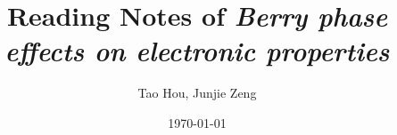 \documentclass[notitlepage]{revtex4-1}%
\begin{document}
	\title{Reading Notes of \textit{Berry phase effects on electronic properties}}
	\author{Tao Hou, Junjie Zeng}
	\date{\today}
	
	\maketitle
	
	
	
%	
	
	\appendix
%	
	
\end{document}

